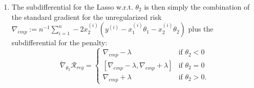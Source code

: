 \documentclass[a4paper]{article}
\begin{document}
{\begin{enumerate}
\begin{enumerate}
  \item $x_0$ is a global minimum as $0 \in \breve{\nabla}_{x_0} f$
  \item The $L1$ penalty has no derivative at $\theta_k = 0$ for all $\theta_k$ with $k\in \{1,\ldots,p\}$. Thus we are particularly interested in the subdifferential at this point, which is  $$\breve{\nabla}_{\theta_k} \lambda \sum_{j=1}^p |\theta_j| = \sum_{j=1}^p \breve{\nabla}_{\theta_k} \lambda |\theta_j| = \breve{\nabla}_{\theta_k} \lambda |\theta_k| = [-\lambda, \lambda],$$ where in the second equation we use that the subdifferential of a constant function is zero. For a (sub-) gradient at any other differentiable point, we get the conventional gradient using the given hint, which is $-\lambda$ for $\theta_k < 0$ and $\lambda$ for $\theta_k > 0$.
  \end{enumerate}
  \item The subdifferential for the Lasso w.r.t. $\theta_2$ is then simply the combination of the standard gradient for the unregularized risk $\nabla_{emp} := n^{-1} \sum_{i=1}^n -2 x^{(i)}_{2} (y^{(i)} - x^{(i)}_{1}\theta_1 - x^{(i)}_{2}\theta_2)$ plus the subdifferential for the penalty: $$\breve{\nabla}_{\theta_2} \mathcal{R}_{reg} =  
  \begin{cases} 
  \nabla_{emp} - \lambda & \text{if } \theta_2 < 0\\
  [\nabla_{emp} - \lambda, \nabla_{emp}  + \lambda] & \text{if } \theta_2 = 0\\
  \nabla_{emp} + \lambda & \text{if } \theta_2 > 0.
  \end{cases}
  $$
  \end{enumerate}



}
\end{document}
